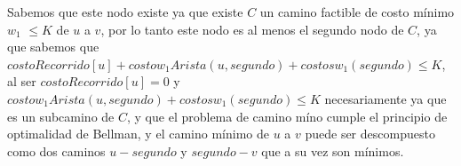 \vspace{2mm}

Sabemos que este nodo existe ya que existe $C$ un camino factible de costo m\'inimo $w_1$ $\leq K$ de $u$ a $v$, por lo tanto este nodo es al menos el segundo nodo de $C$, ya que sabemos que $costoRecorrido[u] + costow_1Arista(u,segundo) + costosw_1(segundo) \leq K $, al ser $costoRecorrido[u]=0$ y $costow_1Arista(u,segundo) + costosw_1(segundo)\leq K$ necesariamente ya que es un subcamino de $C$, y que el problema de camino m\'ino cumple el principio de optimalidad de Bellman, y el camino m\'inimo de $u$ a $v$ puede ser descompuesto como dos caminos $u-segundo$ y $segundo-v$ que a su vez son m\'inimos.

\vspace{2mm}

